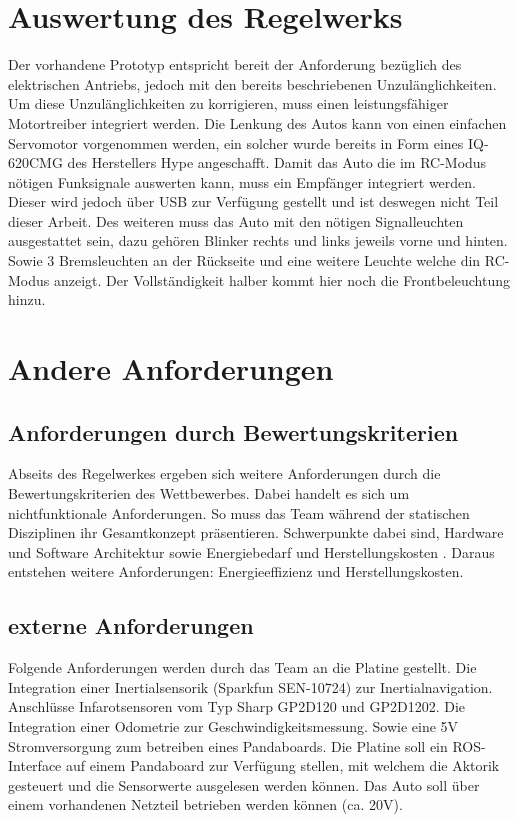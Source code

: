\section{Auswertung des Regelwerks}
Der vorhandene Prototyp entspricht bereit der Anforderung bezüglich des elektrischen Antriebs, jedoch mit den bereits beschriebenen Unzulänglichkeiten. 
Um diese Unzulänglichkeiten zu korrigieren, muss einen leistungsfähiger Motortreiber integriert werden.
Die Lenkung des Autos kann von einen einfachen Servomotor vorgenommen werden, ein solcher wurde bereits in Form eines IQ-620CMG des Herstellers Hype angeschafft. 
Damit das Auto die im RC-Modus nötigen Funksignale auswerten kann, muss ein Empfänger integriert werden. Dieser wird jedoch über USB zur Verfügung gestellt
und ist deswegen nicht Teil dieser Arbeit. Des weiteren muss das Auto mit den nötigen Signalleuchten ausgestattet sein, dazu gehören Blinker rechts und links
jeweils vorne und hinten. Sowie 3 Bremsleuchten an der Rückseite und eine weitere Leuchte welche din RC-Modus anzeigt. Der Vollständigkeit halber kommt hier noch die
Frontbeleuchtung hinzu.

\section{Andere Anforderungen}
\subsection{Anforderungen durch Bewertungskriterien}
Abseits des Regelwerkes ergeben sich weitere Anforderungen durch die Bewertungskriterien des Wettbewerbes. Dabei handelt es sich um nichtfunktionale Anforderungen.
So muss das Team während der statischen Disziplinen ihr Gesamtkonzept präsentieren. Schwerpunkte dabei sind, Hardware und Software Architektur sowie Energiebedarf und 
Herstellungskosten \cite{website-carolo-cup-regelwerk}. Daraus entstehen weitere Anforderungen: Energieeffizienz und Herstellungskosten. \\


\subsection{externe Anforderungen}
Folgende Anforderungen werden durch das Team an die Platine gestellt. Die Integration einer Inertialsensorik (Sparkfun SEN-10724) zur Inertialnavigation.
Anschlüsse Infarotsensoren vom Typ Sharp GP2D120 und GP2D1202. Die Integration einer Odometrie zur Geschwindigkeitsmessung. 
Sowie eine 5V Stromversorgung zum betreiben eines Pandaboards. Die Platine soll ein ROS-Interface auf einem Pandaboard zur Verfügung stellen, mit welchem die Aktorik gesteuert und
die Sensorwerte ausgelesen werden können. Das Auto soll über einem vorhandenen Netzteil betrieben werden können (ca. 20V).

